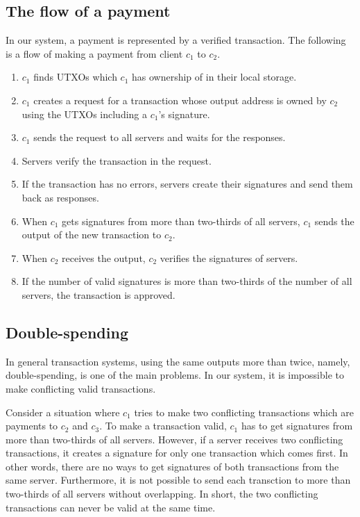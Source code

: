 \documentclass[a4paper, oneside]{discothesis}
\begin{document}
\subsection{The flow of a payment}
In our system, a payment is represented by a verified transaction.
The following is a flow of making a payment from client $c_1$ to $c_2$.

\begin{enumerate}
    \item $c_1$ finds UTXOs which $c_1$ has ownership of in their local storage.
    \item $c_1$ creates a request for a transaction whose output address is owned by $c_2$
        using the UTXOs including a $c_1$'s signature.
    \item $c_1$ sends the request to all servers and waits for the responses.
    \item Servers verify the transaction in the request.
    \item If the transaction has no errors, servers create their signatures and send them back
        as responses.
    \item When $c_1$ gets signatures from more than two-thirds of all servers,
        $c_1$ sends the output of the new transaction to $c_2$.
    \item When $c_2$ receives the output, $c_2$ verifies the signatures of servers.
    \item If the number of valid signatures is more than two-thirds of the number of all servers,
        the transaction is approved.
\end{enumerate}


\subsection{Double-spending}
In general transaction systems, using the same outputs more than twice,
namely, double-spending, is one of the main problems.
In our system, it is impossible to make conflicting valid transactions.

Consider a situation where $c_1$ tries to make two conflicting transactions
which are payments to $c_2$ and $c_3$.
To make a transaction valid, $c_1$ has to get signatures
from more than two-thirds of all servers.
However, if a server receives two conflicting transactions, it creates a signature for only one
transaction which comes first.
In other words, there are no ways to get signatures of both transactions from the same server.
Furthermore, it is not possible to send each transction to more than two-thirds of all servers
without overlapping.
In short, the two conflicting transactions can never be valid at the same time.
\end{document}
